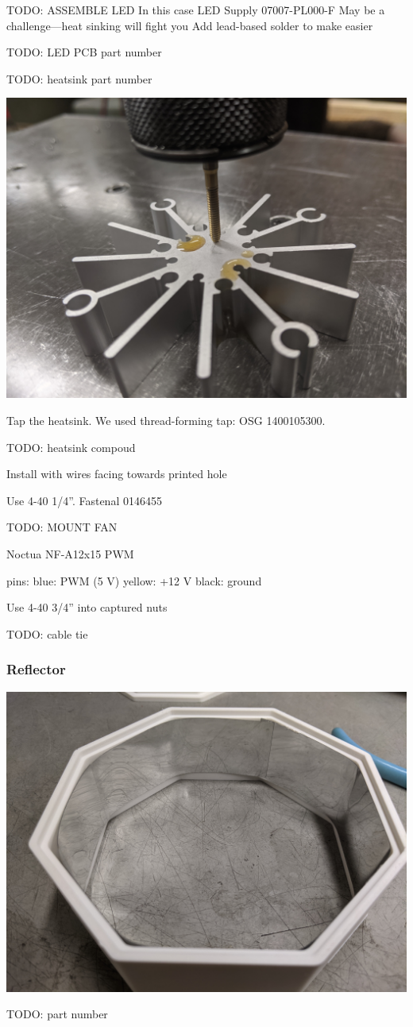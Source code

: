 \documentclass[11pt]{article}
\begin{document}
TODO: ASSEMBLE LED
In this case LED Supply 07007-PL000-F
May be a challenge---heat sinking will fight you
Add lead-based solder to make easier

TODO: LED PCB part number

TODO: heatsink part number

\begin{center}
  \includegraphics[width=\textwidth/2]{"./tap-heatsink.jpg"}
\end{center}

Tap the heatsink.
We used thread-forming tap: OSG 1400105300.

TODO: heatsink compoud

Install with wires facing towards printed hole

Use 4-40 1/4''.   Fastenal 0146455

TODO: MOUNT FAN

Noctua NF-A12x15 PWM

pins:
blue: PWM (5 V)
yellow: +12 V
black: ground

Use 4-40 3/4'' into captured nuts

TODO: cable tie

\subsubsection{Reflector}

\begin{center}
  \includegraphics[width=\textwidth/2]{"./reflector.jpg"}
\end{center}

TODO: part number
\end{document}
